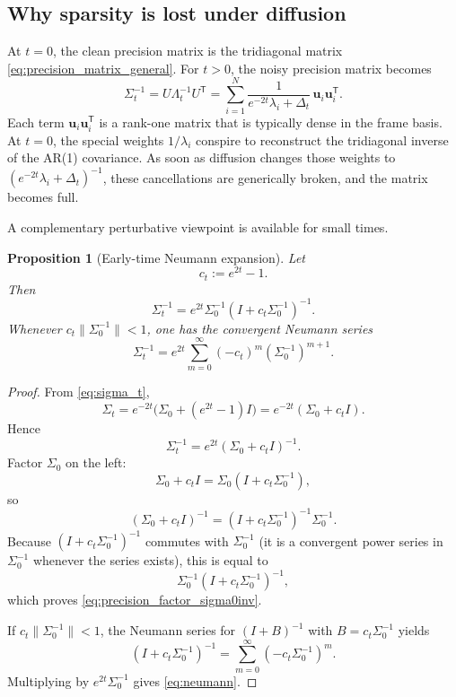 \documentclass[11pt]{article}
\numberwithin{equation}{section}
\newtheorem{proposition}[theorem]{Proposition}
\theoremstyle{definition}
\theoremstyle{remark}
\newcommand{\Id}{I}
\newcommand{\trans}{\mathsf{T}}
\begin{document}
\subsection{Why sparsity is lost under diffusion}

At $t=0$, the clean precision matrix is the tridiagonal matrix \eqref{eq:precision_matrix_general}. For $t>0$, the noisy precision matrix becomes
\[
\Sigma_t^{-1}=U\Lambda_t^{-1}U^\trans
=
\sum_{i=1}^N \frac{1}{e^{-2t}\lambda_i+\Delta_t}\,\mathbf u_i\mathbf u_i^\trans.
\]
Each term $\mathbf u_i\mathbf u_i^\trans$ is a rank-one matrix that is typically dense in the frame basis. At $t=0$, the special weights $1/\lambda_i$ conspire to reconstruct the tridiagonal inverse of the AR(1) covariance. As soon as diffusion changes those weights to $(e^{-2t}\lambda_i+\Delta_t)^{-1}$, these cancellations are generically broken, and the matrix becomes full.

A complementary perturbative viewpoint is available for small times.

\begin{proposition}[Early-time Neumann expansion]\label{prop:neumann}
Let
\[
c_t:=e^{2t}-1.
\]
Then
\begin{equation}\label{eq:precision_factor_sigma0inv}
\Sigma_t^{-1}
=
e^{2t}\Sigma_0^{-1}(\Id+c_t\Sigma_0^{-1})^{-1}.
\end{equation}
Whenever $c_t\|\Sigma_0^{-1}\|<1$, one has the convergent Neumann series
\begin{equation}\label{eq:neumann}
\Sigma_t^{-1}
=
e^{2t}\sum_{m=0}^{\infty}(-c_t)^m(\Sigma_0^{-1})^{m+1}.
\end{equation}
\end{proposition}

\begin{proof}
From \eqref{eq:sigma_t},
\[
\Sigma_t=e^{-2t}\big(\Sigma_0+(e^{2t}-1)\Id\big)=e^{-2t}(\Sigma_0+c_t\Id).
\]
Hence
\[
\Sigma_t^{-1}=e^{2t}(\Sigma_0+c_t\Id)^{-1}.
\]
Factor $\Sigma_0$ on the left:
\[
\Sigma_0+c_t\Id=\Sigma_0(\Id+c_t\Sigma_0^{-1}),
\]
so
\[
(\Sigma_0+c_t\Id)^{-1}=(\Id+c_t\Sigma_0^{-1})^{-1}\Sigma_0^{-1}.
\]
Because $(\Id+c_t\Sigma_0^{-1})^{-1}$ commutes with $\Sigma_0^{-1}$ (it is a convergent power series in $\Sigma_0^{-1}$ whenever the series exists), this is equal to
\[
\Sigma_0^{-1}(\Id+c_t\Sigma_0^{-1})^{-1},
\]
which proves \eqref{eq:precision_factor_sigma0inv}.

If $c_t\|\Sigma_0^{-1}\|<1$, the Neumann series for $(\Id+B)^{-1}$ with $B=c_t\Sigma_0^{-1}$ yields
\[
(\Id+c_t\Sigma_0^{-1})^{-1}=\sum_{m=0}^{\infty}(-c_t\Sigma_0^{-1})^m.
\]
Multiplying by $e^{2t}\Sigma_0^{-1}$ gives \eqref{eq:neumann}.
\end{proof}
\end{document}
